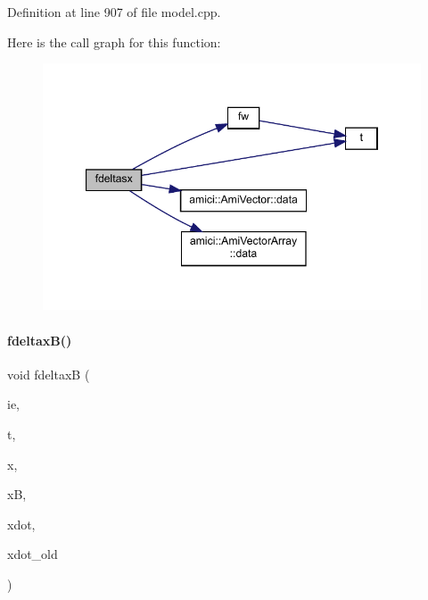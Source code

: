 Definition at line 907 of file model.\+cpp.

Here is the call graph for this function\+:
\nopagebreak
\begin{figure}[H]
\begin{center}
\leavevmode
\includegraphics[width=347pt]{classamici_1_1_model_a685b7374d29d96f7d40d83c7d92fcf27_cgraph}
\end{center}
\end{figure}
\mbox{\label{classamici_1_1_model_a5542077fa03103e502349d92dc95f33a}} 
\paragraph{\texorpdfstring{fdeltax\+B()}{fdeltaxB()}\hspace{0.1cm}{\footnotesize\ttfamily [1/2]}}
{\footnotesize\ttfamily void fdeltaxB (\begin{DoxyParamCaption}\item[{const int}]{ie,  }\item[{const \mbox{\hyperlink{namespaceamici_a1bdce28051d6a53868f7ccbf5f2c14a3}{realtype}}}]{t,  }\item[{const \mbox{\hyperlink{classamici_1_1_ami_vector}{Ami\+Vector}} $\ast$}]{x,  }\item[{const \mbox{\hyperlink{classamici_1_1_ami_vector}{Ami\+Vector}} $\ast$}]{xB,  }\item[{const \mbox{\hyperlink{classamici_1_1_ami_vector}{Ami\+Vector}} $\ast$}]{xdot,  }\item[{const \mbox{\hyperlink{classamici_1_1_ami_vector}{Ami\+Vector}} $\ast$}]{xdot\+\_\+old }\end{DoxyParamCaption})}

